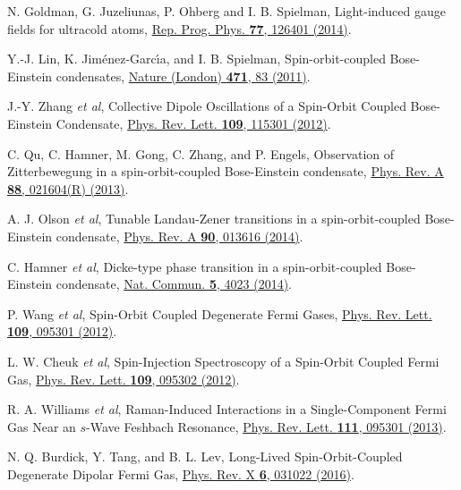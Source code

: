 \documentclass[twocolumn,prl,floatfix,citeautoscript,nofootinbib,superscriptaddress]{revtex4}
\begin{document}
\begin{thebibliography}{99}
 N. Goldman, G. Juzeliunas, P. Ohberg and I. B.
Spielman, {Light-induced gauge fields for ultracold atoms}, \href{https://doi.org/10.1088/0034-4885/77/12/126401}%
{Rep. Prog. Phys. \textbf{77}, 126401 (2014)}.

 Y.-J. Lin, K. Jim\'{e}nez-Garc\'{\i}a, and I. B. Spielman,
{Spin-orbit-coupled Bose-Einstein condensates}, \href{http://dx.doi.org/10.1038/nature09887}%
{Nature (London) \textbf{471}, 83 (2011)}.

 J.-Y. Zhang \textit{et al}, {Collective Dipole
Oscillations of a Spin-Orbit Coupled Bose-Einstein Condensate}, \href{http://dx.doi.org/10.1103/PhysRevLett.109.115301}%
{Phys. Rev. Lett. \textbf{109}, 115301 (2012)}.

 C. Qu, C. Hamner, M. Gong, C. Zhang, and P. Engels, {%
Observation of Zitterbewegung in a spin-orbit-coupled Bose-Einstein
condensate}, \href{http://dx.doi.org/10.1103/PhysRevA.88.021604}{Phys. Rev.
A \textbf{88}, 021604(R) (2013)}.

 A. J. Olson \textit{et al}, {Tunable Landau-Zener
transitions in a spin-orbit-coupled Bose-Einstein condensate}, \href{http://dx.doi.org/10.1103/PhysRevA.90.013616}%
{Phys. Rev. A \textbf{90}, 013616 (2014)}.

 C. Hamner \textit{et al}, {Dicke-type phase transition
in a spin-orbit-coupled Bose-Einstein condensate}, \href{http://dx.doi.org/10.1038/ncomms5023}%
{Nat. Commun. \textbf{5}, 4023 (2014)}.

 P. Wang \textit{et al}, {Spin-Orbit Coupled Degenerate
Fermi Gases}, \href{http://dx.doi.org/10.1103/PhysRevLett.109.095301}{Phys.
Rev. Lett. \textbf{109}, 095301 (2012)}.

 L. W. Cheuk \textit{et al}, {Spin-Injection Spectroscopy
of a Spin-Orbit Coupled Fermi Gas}, \href{http://dx.doi.org/10.1103/PhysRevLett.109.095302}%
{Phys. Rev. Lett. \textbf{109}, 095302 (2012)}.

 R. A. Williams \textit{et al}, {Raman-Induced
Interactions in a Single-Component Fermi Gas Near an $s$-Wave Feshbach
Resonance}, \href{http://dx.doi.org/10.1103/PhysRevLett.111.095301}{Phys.
Rev. Lett. \textbf{111}, 095301 (2013)}.

 N. Q. Burdick, Y. Tang, and B. L. Lev, {Long-Lived
Spin-Orbit-Coupled Degenerate Dipolar Fermi Gas}, \href{https://doi.org/10.1103/PhysRevX.6.031022}%
{Phys. Rev. X \textbf{6}, 031022 (2016)}.


\end{thebibliography}
\end{document}
